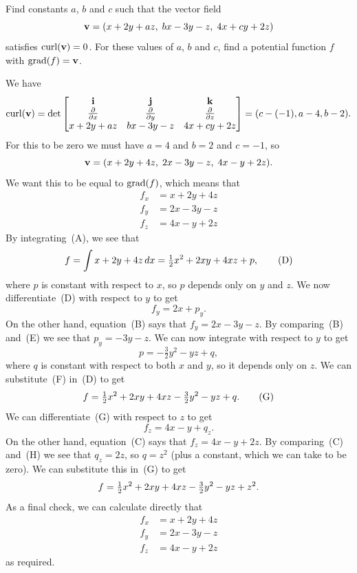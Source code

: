 \documentclass[a4paper]{amsart}
\renewenvironment{solution}{\SolutionInline}{\endSolutionInline}
\begin{document}
\begin{exercise}
 Find constants $a$, $b$ and $c$ such that the vector field
 \[ \mathbf{v} = (x+2y+az,\; bx-3y-z,\; 4x+cy+2z) \]
 satisfies $\operatorname{curl}(\mathbf{v})=0$.  For these values of $a$, $b$ and $c$, find
 a potential function $f$ with $\operatorname{grad}(f)=\mathbf{v}$.
\end{exercise}
\begin{solution}
 We have 
 \[ \operatorname{curl}(\mathbf{v}) = 
     \det\left[\begin{matrix} \mathbf{i} & \mathbf{j} & \mathbf{k} \\
      \frac{\partial}{\partial x} & \frac{\partial}{\partial y} & \frac{\partial}{\partial z} \\
      x+2y+az & bx-3y-z & 4x+cy+2z \end{matrix}\right] = 
       (c-(-1),a-4,b-2).
 \]
 For this to be zero we must have $a=4$ and $b=2$ and $c=-1$, so 
 \[ \mathbf{v} = (x+2y+4z,\; 2x-3y-z,\; 4x-y+2z). \]
 We want this to be equal to $\operatorname{grad}(f)$, which means that
 \begin{align*}
  f_x &= x+2y+4z \tag{A} \\
  f_y &= 2x-3y-z \tag{B} \\
  f_z &= 4x-y+2z \tag{C} 
 \end{align*}
 By integrating~(A), we see that 
 \[ f=\int x+2y+4z\,dx = \tfrac{1}{2} x^2 + 2xy + 4xz + p, \tag{D} \]
 where $p$ is constant with respect to $x$, so $p$ depends only on $y$
 and $z$.  We now differentiate~(D) with respect to $y$ to get
 \[ f_y = 2x+p_y. \tag{E}\]
 On the other hand, equation~(B) says that $f_y=2x-3y-z$.  By
 comparing~(B) and~(E) we see that $p_y=-3y-z$.  We can now integrate
 with respect to $y$ to get 
 \[ p = -\tfrac{3}{2}y^2-yz+q, \tag{F} \]
 where $q$ is constant with respect to both $x$ and $y$, so it depends
 only on $z$.  We can substitute~(F) in~(D) to get
 \[ f = \tfrac{1}{2} x^2 + 2xy + 4xz -\tfrac{3}{2}y^2-yz + q. \tag{G} \]
 We can differentiate~(G) with respect to $z$ to get 
 \[ f_z = 4x - y + q_z. \tag{H} \]
 On the other hand, equation~(C) says that $f_z=4x-y+2z$.  By
 comparing~(C) and~(H) we see that $q_z=2z$, so $q=z^2$ (plus a
 constant, which we can take to be zero).  We can substitute this
 in~(G) to get
 \[ f = \tfrac{1}{2} x^2 + 2xy + 4xz -\tfrac{3}{2}y^2-yz + z^2. \]
 As a final check, we can calculate directly that
 \begin{align*}
  f_x &= x+2y+4z \\
  f_y &= 2x-3y-z \\
  f_z &= 4x-y+2z
 \end{align*}
 as required.
\end{solution}
\end{document}
